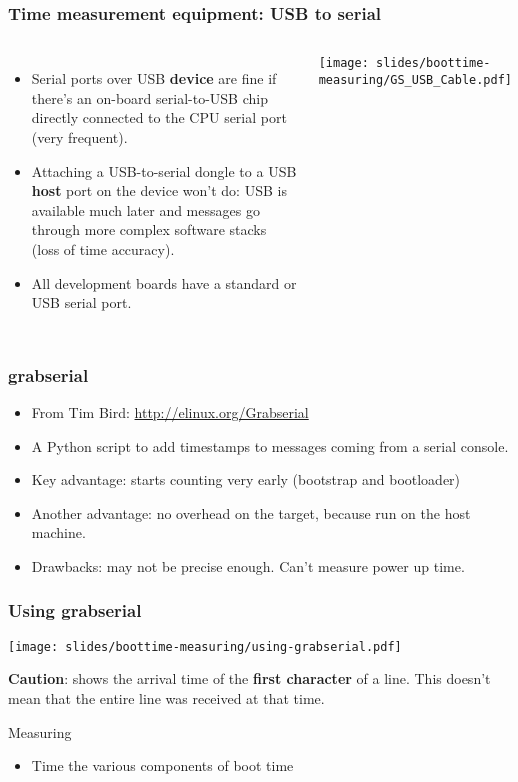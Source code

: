 \begin{frame}
\frametitle{Time measurement equipment: USB to serial}
\begin{columns}
	\begin{itemize}
	\item Serial ports over USB {\bf device} are fine if there's an on-board
      	      serial-to-USB chip directly connected to the CPU serial port (very frequent).
	\item Attaching a USB-to-serial dongle to a USB {\bf host} port on
      	      the device won't do: USB is available much later and messages
      	      go through more complex software stacks (loss of time accuracy).
	\item All development boards have a standard or USB serial port.
	\end{itemize}
    	\texttt{[image: slides/boottime-measuring/GS\_USB\_Cable.pdf]}
\end{columns}
\end{frame}

\begin{frame}
\frametitle{grabserial}
\begin{itemize}
\item From Tim Bird: \url{http://elinux.org/Grabserial}
\item A Python script to add timestamps to messages coming from a
	serial console.
\item Key advantage: starts counting very early (bootstrap and bootloader)
\item Another advantage: no overhead on the target, because run on the host machine.
\item Drawbacks: may not be precise enough. Can't measure power up time.
\end{itemize}
\end{frame}

\begin{frame}
\frametitle{Using grabserial}
\begin{center}
    \texttt{[image: slides/boottime-measuring/using-grabserial.pdf]}
\end{center}
{\small
{\bf Caution}:  shows the arrival time of the
{\bf first character} of a line. This doesn't mean that the entire line
was received at that time.}
\end{frame}

\setuplabframe
{Measuring}
{
\begin{itemize}
\item Time the various components of boot time
\end{itemize}
}
